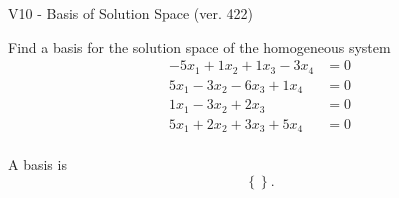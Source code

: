 \begin{exercise}
  \begin{exerciseTitle}V10 - Basis of Solution Space (ver. 422)\end{exerciseTitle}
  \begin{exerciseStatement}
    Find a basis for the solution space of the homogeneous system 
\begin{align*}
 -5 x_ 1 + 1 x_ 2 + 1 x_ 3 -3 x_ 4 &= 0  \\ 
  5 x_ 1 -3 x_ 2 -6 x_ 3 + 1 x_ 4 &= 0  \\ 
  1 x_ 1 -3 x_ 2 + 2 x_ 3 &= 0  \\ 
  5 x_ 1 + 2 x_ 2 + 3 x_ 3 + 5 x_ 4 &= 0  \\ 
 \end{align*}


 
  \end{exerciseStatement}

  \begin{exerciseAnswer}
   A basis is   
\[\left\{\right\}.\]

  


  \end{exerciseAnswer}
\end{exercise}